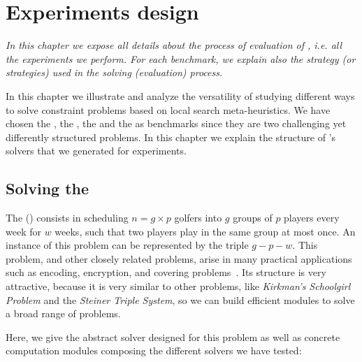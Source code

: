 \chapter{Experiments design}
\label{chap:expe}
\textit{In this chapter we expose all details about the process of evaluation of \posl{}, i.e. all the experiments we perform. For each benchmark, we explain also the strategy (or strategies) used in the solving (evaluation) process.}
\vfill
\minitoc
\newpage

In this chapter we illustrate and analyze the versatility of \posl{} studying different ways to solve constraint problems based on local search meta-heuristics. 
We have chosen the \sgp, the \nqp, the \carrp{} and the \grp{} as benchmarks since they are two challenging yet differently structured problems. In this chapter we explain the structure of \posl's solvers that we generated for experiments.

\section{Solving the \sgp}
\label{sec:golfers}

The \sgp{} (\SGP) consists in scheduling $n=g\times p$ golfers into $g$ groups of $p$ players every week for $w$ weeks, such that two players play in the same group at most once. An instance of this problem can be represented by the triple $g-p-w$. This problem, and other closely related problems, arise in many practical applications such as encoding, encryption, and covering problems~\cite{Lardeux2014}. Its structure is very attractive, because it is very similar to other problems, like \textit{Kirkman's Schoolgirl Problem} and the \textit{Steiner Triple System}, so we can build efficient modules to solve a broad range of problems.

Here, we give the abstract solver designed for this problem as well as concrete computation modules composing the different solvers we have tested:

